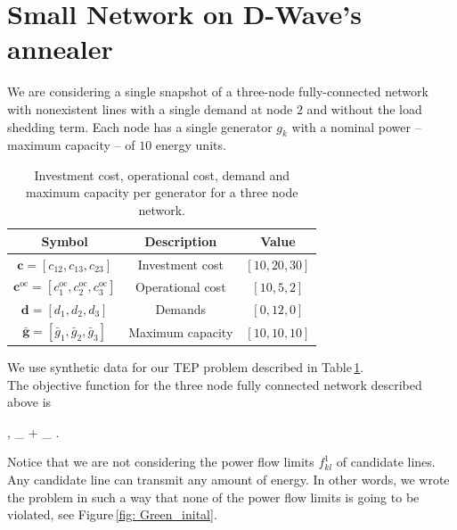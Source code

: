 \section{Small Network on D-Wave's annealer}
 We are considering a single snapshot of a three-node fully-connected network with nonexistent lines with a single demand at node $2$ and without the load shedding term. Each node has a single generator $g_{k}$ with a nominal power -- maximum capacity -- of $10$ energy units.
 \begin{table}[H]
\centering
\begin{tabular}{ |c |c| c| }
  \hline			
  \textbf{Symbol} & \textbf{Description} & \textbf{Value}  \\
    \hline		
   $\mathbf{c} = \left[c_{12},c_{13},c_{23}\right]$ & Investment cost & $\left[10, 20, 30\right]$\\
       \hline		
   $\mathbf{c}^{\text{oc}} = \left[c_{1}^{\text{oc}},c_{2}^{\text{oc}}, c_{3}^{\text{oc}}\right]$ & Operational cost & $\left[10, 5, 2\right]$\\
          \hline		
   $\mathbf{d} = \left[d_{1}, d_{2}, d_{3}\right]$ & Demands & $\left[0, 12, 0\right]$\\
       \hline		
   $\mathbf{\bar{g}} = \left[\bar{g}_{1},\bar{g}_{2},\bar{g}_{3}\right]$ & Maximum capacity & $\left[10, 10, 10\right]$\\
        \hline	
\end{tabular}
\caption{Investment cost, operational cost, demand and maximum capacity per generator for a three node network.}
\label{tab:SmallNetwork}
\end{table}
We use synthetic data for our TEP problem described in Table\,\ref{tab:SmallNetwork}.\\
The objective function for the three node fully connected network described above is
\begin{mini!}[2]
	{, }{_{} + _{}}{}{}{}
    .
    \end{mini!}
Notice that we are not considering the power flow limits $f_{kl}^{1}$ of candidate lines. Any candidate line can transmit any amount of energy. In other words, we wrote the problem in such a way that none of the power flow limits is going to be violated, see Figure\,\ref{fig: Green_inital}.
